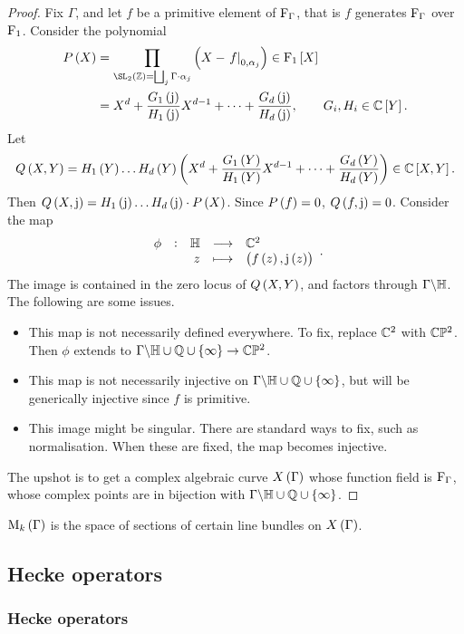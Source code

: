 \begin{proof}
Fix $ \Gamma $, and let $ f $ be a primitive element of $ \mathrm{F}_\Gamma $, that is $ f $ generates $ \mathrm{F}_\Gamma $ over $ \mathrm{F}_1 $. Consider the polynomial
\begin{align*}
P\br{X}
& = \prod_{\SL_2\br{\ZZ} = \bigsqcup_j \Gamma \cdot \alpha_j} \br{X - \eval{f}_{0, \alpha_j}} \in \F_1\sbr{X} \\
& = X^d + \dfrac{G_1\br{\j}}{H_1\br{\j}}X^{d - 1} + \dots + \dfrac{G_d\br{\j}}{H_d\br{\j}}, \qquad G_i, H_i \in \CC\sbr{Y}.
\end{align*}
Let
$$ Q\br{X, Y} = H_1\br{Y} \dots H_d\br{Y}\br{X^d + \dfrac{G_1\br{Y}}{H_1\br{Y}}X^{d - 1} + \dots + \dfrac{G_d\br{Y}}{H_d\br{Y}}} \in \CC\sbr{X, Y}. $$
Then $ Q\br{X, \j} = H_1\br{\j} \dots H_d\br{\j} \cdot P\br{X} $. Since $ P\br{f} = 0 $, $ Q\br{f, \j} = 0 $. Consider the map
$$ \function[\phi]{\HH}{\CC^2}{z}{\br{f\br{z}, \j\br{z}}}. $$
The image is contained in the zero locus of $ Q\br{X, Y} $, and factors through $ \Gamma \backslash \mathbb{H} $. The following are some issues.
\begin{itemize}
\item This map is not necessarily defined everywhere. To fix, replace $ \mathbb{C}^2 $ with $ \mathbb{C}\mathbb{P}^2 $. Then $ \phi $ extends to $ \Gamma \backslash \HH \cup \QQ \cup \cbr{\infty} \to \CC\PP^2 $.
\item This map is not necessarily injective on $ \Gamma \backslash \HH \cup \QQ \cup \cbr{\infty} $, but will be generically injective since $ f $ is primitive.
\item This image might be singular. There are standard ways to fix, such as normalisation. When these are fixed, the map becomes injective.
\end{itemize}
The upshot is to get a complex algebraic curve $ X\br{\Gamma} $ whose function field is $ \mathrm{F}_\Gamma $, whose complex points are in bijection with $ \Gamma \backslash \HH \cup \QQ \cup \cbr{\infty} $.
\end{proof}

$ \M_k\br{\Gamma} $ is the space of sections of certain line bundles on $ X\br{\Gamma} $.

\pagebreak

\subsection{Hecke operators}

\subsubsection{Hecke operators}

